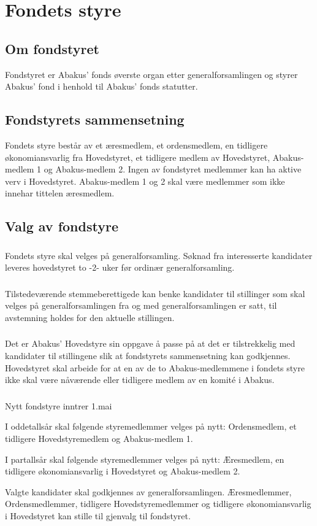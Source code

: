 \section{Fondets styre}
\subsection{Om fondstyret}
Fondstyret er Abakus’ fonds øverste organ etter generalforsamlingen og styrer
Abakus’ fond i henhold til Abakus’ fonds statutter.

\subsection{Fondstyrets sammensetning}
Fondets styre består av et æresmedlem, et ordensmedlem, en tidligere økonomiansvarlig fra
Hovedstyret, et tidligere medlem av Hovedstyret, Abakus-medlem 1 og Abakus-medlem 2.
Ingen av fondstyret medlemmer kan ha aktive verv i Hovedstyret. Abakus-medlem 1 og 2 skal
være medlemmer som ikke innehar tittelen æresmedlem.

\subsection{Valg av fondstyre}
\subsubsection{}
Fondets styre skal velges på generalforsamling. Søknad fra interesserte kandidater
leveres hovedstyret to -2- uker før ordinær generalforsamling.

\subsubsection{}
Tilstedeværende stemmeberettigede kan benke kandidater til stillinger som skal velges
på generalforsamlingen fra og med generalforsamlingen er satt, til avstemning holdes for
den aktuelle stillingen.

\subsubsection{}
Det er Abakus’ Hovedstyre sin oppgave å passe på at det er tilstrekkelig med kandidater til
stillingene slik at fondstyrets sammensetning kan godkjennes. Hovedstyret skal arbeide for
at en av de to Abakus-medlemmene i fondets styre ikke skal være nåværende eller tidligere
medlem av en komité i Abakus.

\subsubsection{}
Nytt fondstyre inntrer 1.mai

I oddetallsår skal følgende styremedlemmer velges på nytt: Ordensmedlem, et tidligere
Hovedstyremedlem og Abakus-medlem 1.

I partallsår skal følgende styremedlemmer velges på nytt: Æresmedlem, en tidligere
økonomiansvarlig i Hovedstyret og Abakus-medlem 2.

Valgte kandidater skal godkjennes av generalforsamlingen. Æresmedlemmer, Ordensmedlemmer,
tidligere Hovedstyremedlemmer og tidligere økonomiansvarlig i Hovedstyret kan
stille til gjenvalg til fondstyret.
